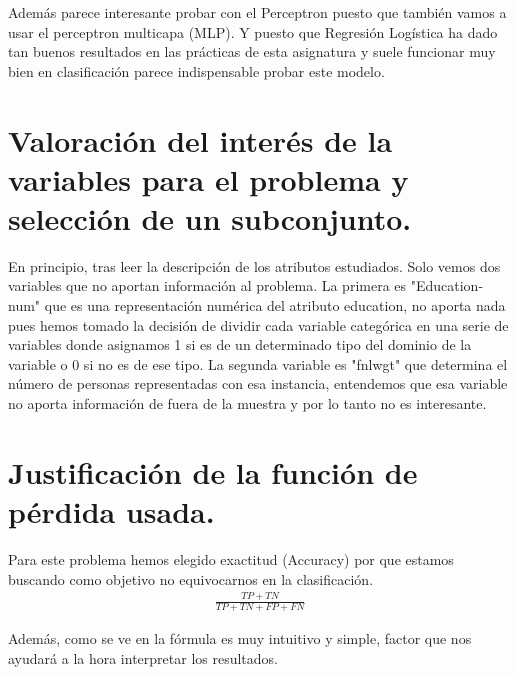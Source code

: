 \documentclass[a4paper,11pt]{article}
\begin{document}
Además parece interesante probar con el Perceptron puesto que también vamos a usar el perceptron multicapa (MLP). Y puesto que Regresión Logística ha dado tan buenos resultados en las prácticas de esta asignatura y suele funcionar muy bien en clasificación parece indispensable probar este modelo.

\section{}

\section{Valoración del interés de la variables para el problema y selección de un subconjunto.}

En principio, tras leer la descripción de los atributos estudiados. Solo vemos dos variables que no aportan información al problema. La primera es "Education-num" que es una representación numérica del atributo education, no aporta nada pues hemos tomado la decisión de dividir cada variable categórica en una serie de variables donde asignamos 1 si es de un determinado tipo del dominio de la variable o 0 si no es de ese tipo. La segunda variable es "fnlwgt" que determina el número de personas representadas con esa instancia, entendemos que esa variable no aporta información de fuera de la muestra y por lo tanto no es interesante.

\section{}

\section{Justificación de la función de pérdida usada.}

Para este problema hemos elegido exactitud (Accuracy) por que estamos buscando como objetivo no equivocarnos en la clasificación. 
\begin{align*}
\frac{TP+TN}{TP+TN+FP+FN}
\end{align*}

Además, como se ve en la fórmula es muy intuitivo y simple, factor que nos ayudará a la hora interpretar los resultados.

\section{}
\end{document}
